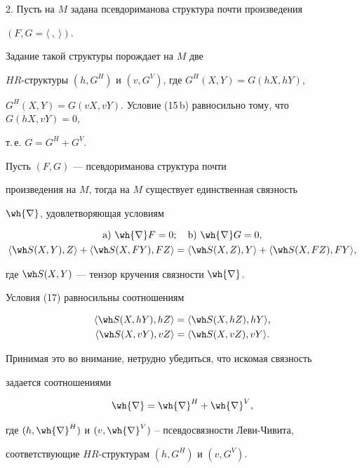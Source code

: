 2. Пусть на $M$ задана псевдориманова структура почти произведения


$(F, G=\langle\ ,\ \rangle)$.


Задание такой структуры порождает на $M$ две


$HR$-структуры $(h, G^H)$ и $(v,G^V)$, где $G^H(X,Y)=G(hX, hY)$,


$G^H(X,Y)=G(vX, vY)$. Условие (15\,b) равносильно тому, что $G(hX, vY)=0$,


т.\,е. $G=G^H+G^V$.





\begin{thm}


Пусть $(F,G)$ --- псевдориманова структура почти


произведения на $M$, тогда на $M$ существует единственная связность


$\wh{\nb}$, удовлетворяющая условиям


\begin{gather}


\mathrm a)\ \wh{\nb}F=0;\quad \mathrm b)\ \wh{\nb}G=0,\\


%


\langle \wh S (X, Y), Z\rangle +


\langle\wh S (X, FY),F Z\rangle=\langle\wh S (X, Z), Y\rangle+


\langle\wh S (X,FZ), FY\rangle,


\end{gather}


где $\wh S (X, Y)$ --- тензор кручения связности $\wh{\nb}$.


\end{thm}





\begin{pf}


Условия (17) равносильны соотношениям


\begin{align*}


\langle \wh S (X, hY), hZ\rangle &=\langle \wh S (X, hZ), hY\rangle, \\


\langle\wh S (X, vY),v Z\rangle &=\langle\wh S (X, vZ), vY\rangle.


\end{align*}


Принимая это во внимание, нетрудно убедиться, что искомая связность


задается соотношениями


\begin{equation}


\wh{\nb}=\wh{\nb}^H+\wh{\nb}^V,


\end{equation}


где $(h,\wh{\nb}^H)$ и $(v,\wh{\nb}^V)$ -- псевдосвязности Леви-Чивита,


соответствующие $HR$-структурам $(h, G^H)$ и $(v,G^V)$.


\end{pf}





